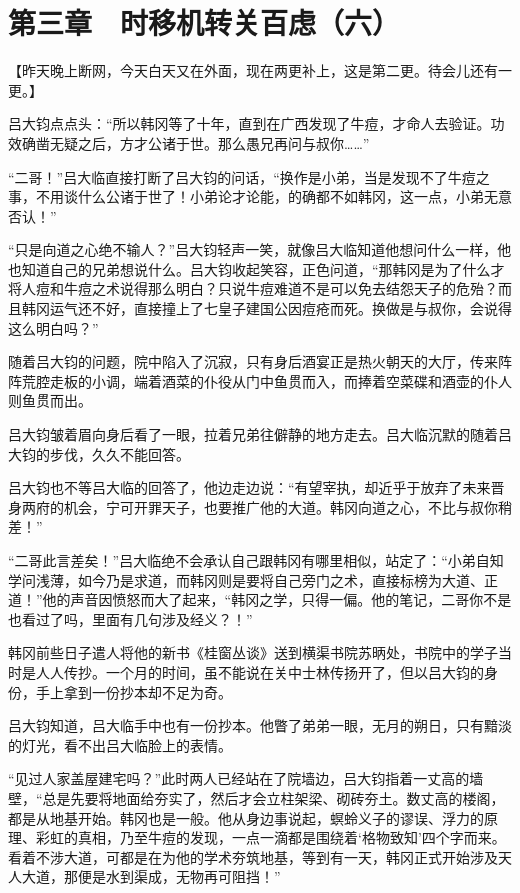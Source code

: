 \section{第三章　时移机转关百虑（六）}

【昨天晚上断网，今天白天又在外面，现在两更补上，这是第二更。待会儿还有一更。】

吕大钧点点头：“所以韩冈等了十年，直到在广西发现了牛痘，才命人去验证。功效确凿无疑之后，方才公诸于世。那么愚兄再问与叔你……”

“二哥！”吕大临直接打断了吕大钧的问话，“换作是小弟，当是发现不了牛痘之事，不用谈什么公诸于世了！小弟论才论能，的确都不如韩冈，这一点，小弟无意否认！”

“只是向道之心绝不输人？”吕大钧轻声一笑，就像吕大临知道他想问什么一样，他也知道自己的兄弟想说什么。吕大钧收起笑容，正色问道，“那韩冈是为了什么才将人痘和牛痘之术说得那么明白？只说牛痘难道不是可以免去结怨天子的危殆？而且韩冈运气还不好，直接撞上了七皇子建国公因痘疮而死。换做是与叔你，会说得这么明白吗？”

随着吕大钧的问题，院中陷入了沉寂，只有身后酒宴正是热火朝天的大厅，传来阵阵荒腔走板的小调，端着酒菜的仆役从门中鱼贯而入，而捧着空菜碟和酒壶的仆人则鱼贯而出。

吕大钧皱着眉向身后看了一眼，拉着兄弟往僻静的地方走去。吕大临沉默的随着吕大钧的步伐，久久不能回答。

吕大钧也不等吕大临的回答了，他边走边说：“有望宰执，却近乎于放弃了未来晋身两府的机会，宁可开罪天子，也要推广他的大道。韩冈向道之心，不比与叔你稍差！”

“二哥此言差矣！”吕大临绝不会承认自己跟韩冈有哪里相似，站定了：“小弟自知学问浅薄，如今乃是求道，而韩冈则是要将自己旁门之术，直接标榜为大道、正道！”他的声音因愤怒而大了起来，“韩冈之学，只得一偏。他的笔记，二哥你不是也看过了吗，里面有几句涉及经义？！”

韩冈前些日子遣人将他的新书《桂窗丛谈》送到横渠书院苏昞处，书院中的学子当时是人人传抄。一个月的时间，虽不能说在关中士林传扬开了，但以吕大钧的身份，手上拿到一份抄本却不足为奇。

吕大钧知道，吕大临手中也有一份抄本。他瞥了弟弟一眼，无月的朔日，只有黯淡的灯光，看不出吕大临脸上的表情。

“见过人家盖屋建宅吗？”此时两人已经站在了院墙边，吕大钧指着一丈高的墙壁，“总是先要将地面给夯实了，然后才会立柱架梁、砌砖夯土。数丈高的楼阁，都是从地基开始。韩冈也是一般。他从身边事说起，螟蛉义子的谬误、浮力的原理、彩虹的真相，乃至牛痘的发现，一点一滴都是围绕着‘格物致知’四个字而来。看着不涉大道，可都是在为他的学术夯筑地基，等到有一天，韩冈正式开始涉及天人大道，那便是水到渠成，无物再可阻挡！”

